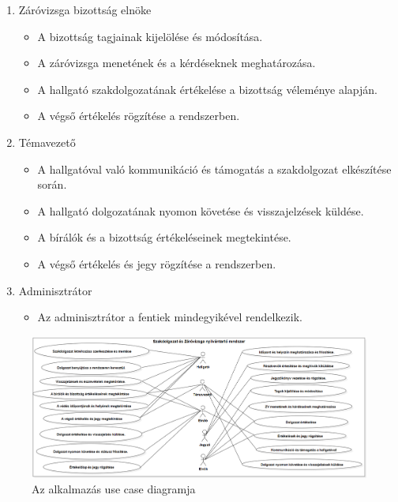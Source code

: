 \begin{enumerate}
\newpage
\item Záróvizsga bizottság elnöke
\begin{itemize}
\item A bizottság tagjainak kijelölése és módosítása.

\item A záróvizsga menetének és a kérdéseknek meghatározása.

\item A hallgató szakdolgozatának értékelése a bizottság véleménye alapján.

\item A végső értékelés rögzítése a rendszerben.
\end{itemize}

\item Témavezető

\begin{itemize}
\item A hallgatóval való kommunikáció és támogatás a szakdolgozat elkészítése során.

\item A hallgató dolgozatának nyomon követése és visszajelzések küldése.

\item A bírálók és a bizottság értékeléseinek megtekintése.

\item A végső értékelés és jegy rögzítése a rendszerben.


\end{itemize}

\item Adminisztrátor

\begin{itemize}

\item Az adminisztrátor a fentiek mindegyikével rendelkezik.

\end{itemize}

\end{enumerate}

\begin{figure}[ht]
\includegraphics[width=1.5\textwidth, margin=0pt 0pt 0pt 0pt]{images/UseCaseDiagram1.png}
\caption{Az alkalmazás use case diagramja}
\label{fig:usecase}
\end{figure}
\newpage

